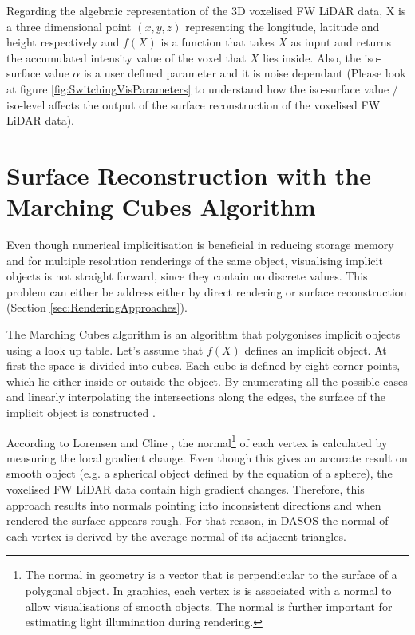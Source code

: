 \documentclass{subfiles}
\begin{document}
\par Regarding the algebraic representation of the 3D voxelised FW LiDAR data, X is a three dimensional point $\mathit{(x, y, z) }$ representing the longitude, latitude and height respectively and ${f(X)}$ is a function that takes  $\mathit{X}$ as input and returns the accumulated intensity value of the voxel that  $\mathit{X}$ lies inside. Also, the iso-surface value $\mathit{\alpha }$ is a user defined parameter and it is noise dependant (Please look at figure \ref{fig:SwitchingVisParameters} to understand how the iso-surface value / iso-level affects the output of the surface reconstruction of the voxelised FW LiDAR data). 




\section {Surface Reconstruction with the Marching Cubes Algorithm}\label{sec:SurfaceReconstruction}

\par Even though numerical implicitisation is beneficial in reducing storage memory and for multiple resolution renderings of the same object, visualising implicit objects is not straight forward, since they contain no discrete values. This problem can either be address either by direct rendering or surface reconstruction (Section \ref{sec:RenderingApproaches}). 

\par The Marching Cubes algorithm is an algorithm that polygonises implicit objects using a look up table. Let’s assume that $f(X)$ defines an implicit object. At first the space is divided into cubes. Each cube is defined by eight corner points, which lie either inside or outside the object. By enumerating all the possible cases and linearly interpolating the intersections along the edges, the surface of the implicit object is constructed \cite{Lorensen1987}. 

\par According to Lorensen and Cline \cite{Lorensen1987}, the normal\footnote{The normal in geometry is a vector that is perpendicular to the surface of a polygonal object. In graphics, each vertex is is associated with a normal to allow visualisations of smooth objects. The normal is further important for estimating light illumination during rendering.} of each vertex is calculated by measuring the local gradient change. Even though this gives an accurate result on smooth object (e.g. a spherical object defined by the equation of a sphere), the voxelised FW LiDAR data contain high gradient changes. Therefore, this approach results into normals pointing into inconsistent directions and when rendered the surface appears rough. For that reason, in DASOS the normal of each vertex is derived by the average normal of its adjacent triangles. 
\end{document}
